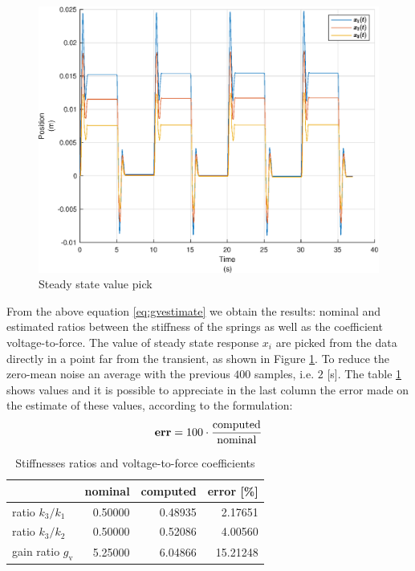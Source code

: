 \begin{figure}[htb]
	\centering
	\includegraphics[width=\textwidth]{steadystate}
	\caption{Steady state value pick}
	\label{fig:steadystate}
\end{figure}
From the above equation \eqref{eq:gvestimate} we obtain the results: nominal 
and estimated ratios between the stiffness of the springs as well as the 
coefficient voltage-to-force.
The value of steady state response \(x_{i}\) are picked from the data directly 
in a point far from the transient, as shown in Figure \ref{fig:steadystate}. 
To reduce the zero-mean noise an average with the previous \(400\) samples, i.e.
\(2\) [\si{\second}].
The table \ref{tab:error} shows values and it is possible to appreciate in the 
last column the error made on the estimate of these values, according to the 
formulation:
\begin{equation}
	\label{eq:ratioerror}
	\text{\textbf{err}} = 100\cdot\frac{\text{computed}}{\text{nominal}}
\end{equation}
%
%
\begin{table}[ht]
\centering
	\begin{tabular}{lrrr}
	\toprule
						& nominal & computed & error [\%] \\
 	\midrule
 		ratio $k_{3}/k_{1}$	& 0.50000 & 0.48935 &	2.17651 \\
		ratio $k_{3}/k_{2}$	& 0.50000 & 0.52086 & 	4.00560 \\
		gain ratio $g_{\text{v}}$ & 5.25000 & 6.04866 &  15.21248	\\
	\bottomrule
	\end{tabular}
	\caption{Stiffnesses ratios and voltage-to-force coefficients}
	\label{tab:error}
\end{table}
%
